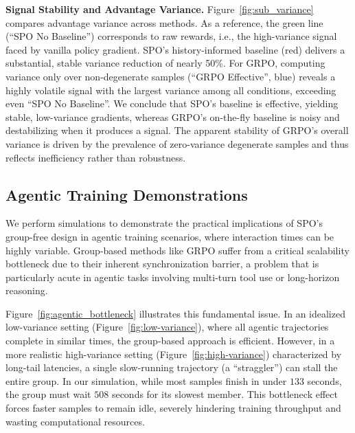 \textbf{Signal Stability and Advantage Variance.} Figure~\ref{fig:sub_variance} compares advantage variance across methods. As a reference, the green line (``SPO No Baseline'') corresponds to raw rewards, i.e., the high-variance signal faced by vanilla policy gradient. SPO’s history-informed baseline (red) delivers a substantial, stable variance reduction of nearly 50\%. For GRPO, computing variance only over non-degenerate samples (``GRPO Effective'', blue) reveals a highly volatile signal with the largest variance among all conditions, exceeding even ``SPO No Baseline''. We conclude that SPO’s baseline is effective, yielding stable, low-variance gradients, whereas GRPO’s on-the-fly baseline is noisy and destabilizing when it produces a signal. The apparent stability of GRPO’s overall variance is driven by the prevalence of zero-variance degenerate samples and thus reflects inefficiency rather than robustness.


\subsection{Agentic Training Demonstrations}
We perform simulations to demonstrate the practical implications of SPO's group-free design in agentic training scenarios, where interaction times can be highly variable. Group-based methods like GRPO suffer from a critical scalability bottleneck due to their inherent synchronization barrier, a problem that is particularly acute in agentic tasks involving multi-turn tool use or long-horizon reasoning.

Figure~\ref{fig:agentic_bottleneck} illustrates this fundamental issue. In an idealized low-variance setting (Figure~\ref{fig:low-variance}), where all agentic trajectories complete in similar times, the group-based approach is efficient. However, in a more realistic high-variance setting (Figure~\ref{fig:high-variance}) characterized by long-tail latencies, a single slow-running trajectory (a ``straggler'') can stall the entire group. In our simulation, while most samples finish in under $133$ seconds, the group must wait $508$ seconds for its slowest member. This bottleneck effect forces faster samples to remain idle, severely hindering training throughput and wasting computational resources.

